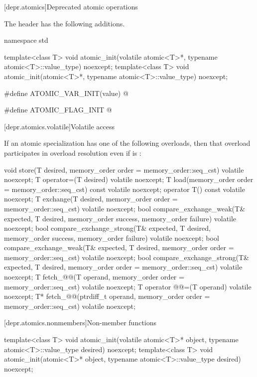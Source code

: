 [depr.atomics]{Deprecated atomic operations}

\pnum
The header  has the following additions.

\begin{codeblock}
namespace std {
  template<class T>
    void atomic_init(volatile atomic<T>*, typename atomic<T>::value_type) noexcept;
  template<class T>
    void atomic_init(atomic<T>*, typename atomic<T>::value_type) noexcept;

  #define ATOMIC_VAR_INIT(value) @\seebelow@

  #define ATOMIC_FLAG_INIT @\seebelow@
}
\end{codeblock}

[depr.atomics.volatile]{Volatile access}

\pnum
If an atomic specialization has one of the following overloads,
then that overload participates in overload resolution
even if  is :
\begin{codeblock}
void store(T desired, memory_order order = memory_order::seq_cst) volatile noexcept;
T operator=(T desired) volatile noexcept;
T load(memory_order order = memory_order::seq_cst) const volatile noexcept;
operator T() const volatile noexcept;
T exchange(T desired, memory_order order = memory_order::seq_cst) volatile noexcept;
bool compare_exchange_weak(T& expected, T desired,
                           memory_order success, memory_order failure) volatile noexcept;
bool compare_exchange_strong(T& expected, T desired,
                             memory_order success, memory_order failure) volatile noexcept;
bool compare_exchange_weak(T& expected, T desired,
                           memory_order order = memory_order::seq_cst) volatile noexcept;
bool compare_exchange_strong(T& expected, T desired,
                             memory_order order = memory_order::seq_cst) volatile noexcept;
T fetch_@@(T operand, memory_order order = memory_order::seq_cst) volatile noexcept;
T operator @@=(T operand) volatile noexcept;
T* fetch_@@(ptrdiff_t operand, memory_order order = memory_order::seq_cst) volatile noexcept;
\end{codeblock}

[depr.atomics.nonmembers]{Non-member functions}

%
\begin{itemdecl}
template<class T>
  void atomic_init(volatile atomic<T>* object, typename atomic<T>::value_type desired) noexcept;
template<class T>
  void atomic_init(atomic<T>* object, typename atomic<T>::value_type desired) noexcept;
\end{itemdecl}

